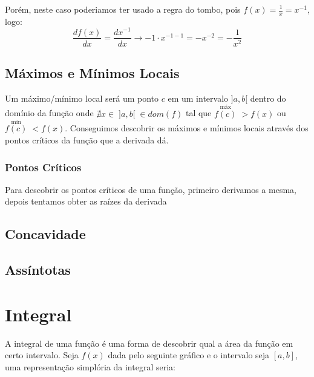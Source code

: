 \documentclass{article}
\begin{document}
    Porém, neste caso poderiamos ter usado a regra do tombo, pois
    $f(x) = \frac{1}{x} = x^{-1}$, logo:
    \begin{equation*}
        \frac{df(x)}{dx} = \frac{dx^{-1}}{dx} \rightarrow - 1 \cdot
        x^{-1 - 1} = - x^{-2} = -\frac{1}{x^2}
    \end{equation*}

    \subsection{Máximos e Mínimos Locais}
    Um máximo/mínimo local será um ponto $c$ em um intervalo $]a,b[$
    dentro do domínio da função onde $\nexists x \in\; ]a,b[ \;\in
    dom(f)$ tal que $\stackrel{\text{máx}}{f(c)}\; > f(x)$ ou
    $\stackrel{\text{mín}}{f(c)}\; < f(x)$. Conseguimos descobrir os
    máximos e mínimos locais através dos pontos críticos da função
    que a derivada dá.

    \subsubsection*{Pontos Críticos}
    Para descobrir os pontos críticos de uma função, primeiro
    derivamos a mesma, depois tentamos obter as raízes da derivada

    \subsection{Concavidade}

    \subsection{Assíntotas}

    \section{Integral}
    A integral de uma função é uma forma de descobrir qual a área da
    função em certo intervalo. Seja $f(x)$ dada pelo seguinte gráfico
    e o intervalo seja $[a,b]$, uma representação simplória da
    integral seria:
\end{document}
